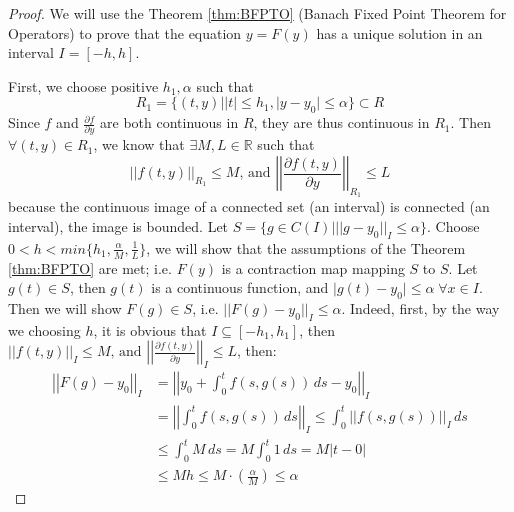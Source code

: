 \documentclass{article}
\theoremstyle{definition}
\theoremstyle{remark}
\theoremstyle{example}
\begin{document}
\begin{proof}
    \cite{r_kent_nagle_fundamentals_2011}We will use the Theorem \ref{thm:BFPTO} (Banach Fixed Point Theorem for Operators) to prove that the equation $y = F(y)$ has a unique solution in an interval $I = [-h, h]$. 

    First, we choose positive $h_1, \alpha$ such that 
    \begin{equation}
        R_1 = \{(t,y)\lvert \lvert t \rvert \leq h_1, \lvert y - y_0 \rvert \leq \alpha\} \subset R
    \end{equation}
    Since $f$ and $\tfrac{\partial f}{\partial y}$ are both continuous in $R$, they are thus continuous in $R_1$. Then $\forall (t,y) \in R_1$, we know that $\exists M, L \in \mathbb{R}$ such that
    \begin{equation}\label{eqn:bddAssumption}
        \lvert\lvert f(t,y) \rvert\rvert_{R_1} \leq M \text{, and }\left\lvert\left\lvert \dfrac{\partial f(t,y)}{\partial y} \right\rvert\right\rvert_{R_1} \leq L
    \end{equation}
    because the continuous image of a connected set (an interval) is connected (an interval), the image is bounded. Let $S = \{g \in C(I) \lvert \lvert \lvert g - y_0\rvert\rvert_{I} \leq \alpha\}$. Choose $0 < h < min\{h_1, \tfrac{\alpha}{M}, \tfrac{1}{L}\}$, we will show that the assumptions of the Theorem \ref{thm:BFPTO} are met; i.e. $F(y)$ is a contraction map mapping $S$ to $S$.
    Let $g(t) \in S$, then $g(t)$ is a continuous function, and $\lvert g(t) - y_0 \rvert \leq \alpha\; \forall x \in I$. Then we will show $F(g) \in S$, i.e. $\lvert\lvert F(g) - y_0 \rvert\rvert_{I} \leq \alpha$. Indeed, first, by the way we choosing $h$, it is obvious that $I \subseteq [-h_1, h_1]$, then $\lvert\lvert f(t,y) \rvert\rvert_{I} \leq M \text{, and }\left\lvert\left\lvert \tfrac{\partial f(t,y)}{\partial y} \right\rvert\right\rvert_{I} \leq L$, then: 
    \begin{align}
        \left\lvert\left\lvert F(g) - y_0 \right\rvert\right\rvert_{I} &= \left\lvert\left\lvert y_0 + \int_{0}^{t}{f(s,g(s))}\,ds - y_0\right\rvert\right\rvert_{I}\\
        &=\left\lvert\left\lvert \int_{0}^{t}{f(s,g(s))}\,ds\right\rvert\right\rvert_{I} \leq \int_{0}^{t}{\lvert\lvert f(s,g(s))\rvert\rvert_{I}}\,ds\\
        &\leq \int_{0}^{t}{M}\,ds = M\int_{0}^{t}{1}\,ds = M\lvert t - 0\rvert\\
        &\leq Mh \leq M\cdot (\tfrac{\alpha}{M}) \leq \alpha
    \end{align}

\end{proof}
\end{document}
